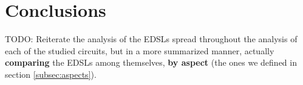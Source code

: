\section{Conclusions}
\label{sec:conclusions}
    TODO: Reiterate the analysis of the EDSLs spread throughout the analysis of each of the studied
    circuits, but in a more summarized manner, actually \textbf{comparing} the EDSLs among
    themselves, \textbf{by aspect} (the ones we defined in section \ref{subsec:aspects}).
